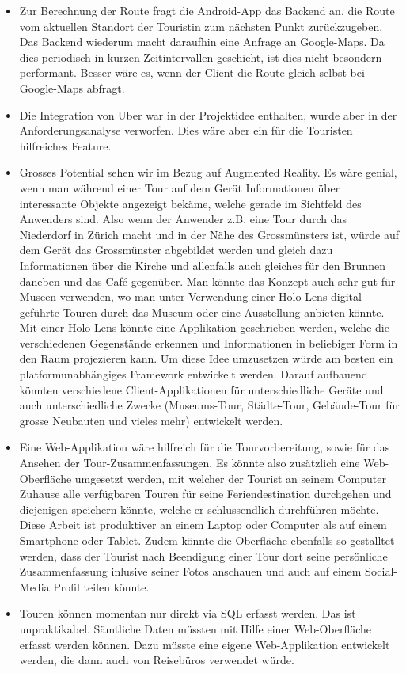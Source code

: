 \begin{itemize}
  \item Zur Berechnung der Route fragt die Android-App das Backend an, die Route vom aktuellen Standort der Touristin zum nächsten Punkt zurückzugeben. Das Backend wiederum macht daraufhin eine Anfrage an Google-Maps. Da dies periodisch in kurzen Zeitintervallen geschieht, ist dies nicht besondern performant. Besser wäre es, wenn der Client die Route gleich selbst bei Google-Maps abfragt.
  \item Die Integration von Uber war in der Projektidee enthalten, wurde aber in der Anforderungsanalyse verworfen. Dies wäre aber ein für die Touristen hilfreiches Feature.
  \item Grosses Potential sehen wir im Bezug auf Augmented Reality. Es wäre genial, wenn man während einer Tour auf dem Gerät Informationen über interessante Objekte angezeigt bekäme, welche gerade im Sichtfeld des Anwenders sind. Also wenn der Anwender z.B. eine Tour durch das Niederdorf in Zürich macht und in der Nähe des Grossmünsters ist, würde auf dem Gerät das Grossmünster abgebildet werden und gleich dazu Informationen über die Kirche und allenfalls auch gleiches für den Brunnen daneben und das Café gegenüber. Man könnte das Konzept auch sehr gut für Museen verwenden, wo man unter Verwendung einer Holo-Lens digital geführte Touren durch das Museum oder eine Ausstellung anbieten könnte. Mit einer Holo-Lens könnte eine Applikation geschrieben werden, welche die verschiedenen Gegenstände erkennen und Informationen in beliebiger Form in den Raum projezieren kann. Um diese Idee umzusetzen würde am besten ein platformunabhängiges Framework entwickelt werden. Darauf aufbauend könnten verschiedene Client-Applikationen für unterschiedliche Geräte und auch unterschiedliche Zwecke (Museums-Tour, Städte-Tour, Gebäude-Tour für grosse Neubauten und vieles mehr) entwickelt werden.
  \item Eine Web-Applikation wäre hilfreich für die Tourvorbereitung, sowie für das Ansehen der Tour-Zusammenfassungen. Es könnte also zusätzlich eine Web-Oberfläche umgesetzt werden, mit welcher der Tourist an seinem Computer Zuhause alle verfügbaren Touren für seine Feriendestination durchgehen und diejenigen speichern könnte, welche er schlussendlich durchführen möchte. Diese Arbeit ist produktiver an einem Laptop oder Computer als auf einem Smartphone oder Tablet. Zudem könnte die Oberfläche ebenfalls so gestalltet werden, dass der Tourist nach Beendigung einer Tour dort seine persönliche Zusammenfassung inlusive seiner Fotos anschauen und auch auf einem Social-Media Profil teilen könnte.
  \item Touren können momentan nur direkt via SQL erfasst werden. Das ist unpraktikabel. Sämtliche Daten müssten mit Hilfe einer Web-Oberfläche erfasst werden können. Dazu müsste eine eigene Web-Applikation entwickelt werden, die dann auch von Reisebüros verwendet würde.
\end{itemize}
